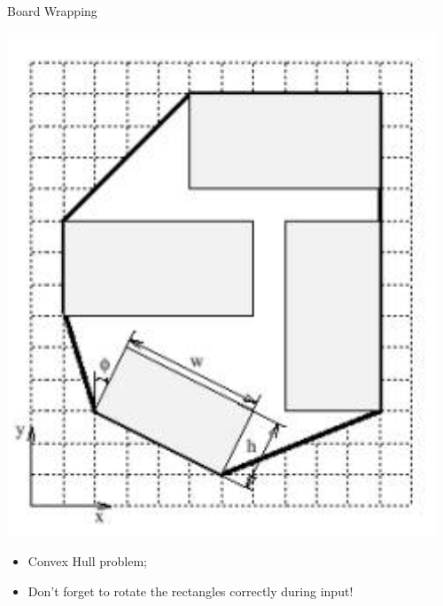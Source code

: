 \begin{frame}{Board Wrapping}
  \begin{center}
    \includegraphics[width=.4\textwidth]{../img/problem_wrapping}
  \end{center}
  \begin{itemize}
    \item Convex Hull problem;
    \item Don't forget to rotate the rectangles correctly during input!
  \end{itemize}
\end{frame}
